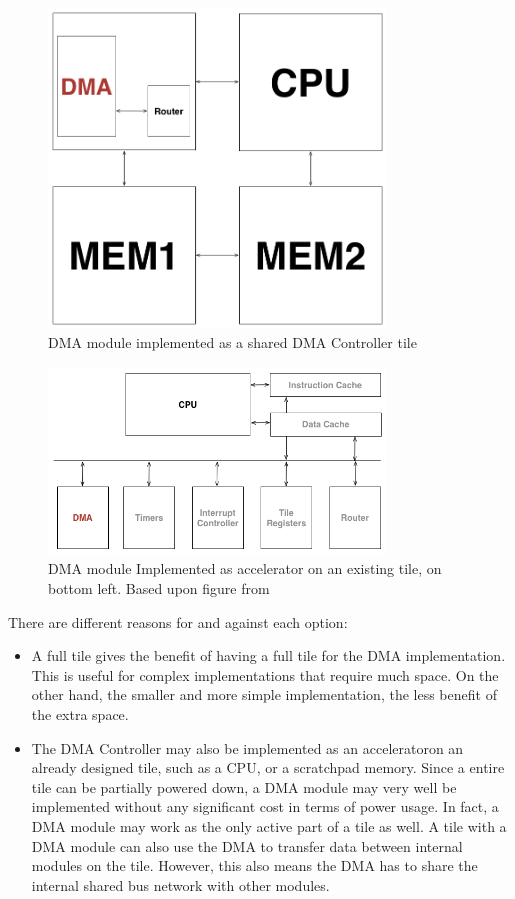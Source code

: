 \begin{figure}[h!]
    \centering
    \includegraphics[width=0.8\textwidth]{Figures/DMA/DMATile}
    \caption{DMA module implemented as a shared DMA Controller tile}
    \label{fig:DMATile}
\end{figure}

\begin{figure}[h!]
    \centering
    \includegraphics[width=0.8\textwidth]{Figures/DMA/Accelerator}
    \caption{DMA module Implemented as accelerator on an existing tile, on bottom left. Based upon figure from \cite{shmac-plan}}
    \label{fig:DMAAccelerator}
\end{figure}

There are different reasons for and against each option:
\begin{itemize}
    \item A full tile gives the benefit of having a full tile for the DMA implementation.
    This is useful for complex implementations that require much space.
    On the other hand, the smaller and more simple implementation, the less benefit of the extra space.
    \item The DMA Controller may also be implemented as an acceleratoron an already designed tile, such as a CPU, or a scratchpad memory.
    Since a entire tile can be partially powered down, a DMA module may very well be implemented without any significant cost in terms of power usage.
    In fact, a DMA module may work as the only active part of a tile as well.
    A tile with a DMA module can also use the DMA to transfer data between internal modules on the tile.
    However, this also means the DMA has to share the internal shared bus network with other modules.
\end{itemize}

